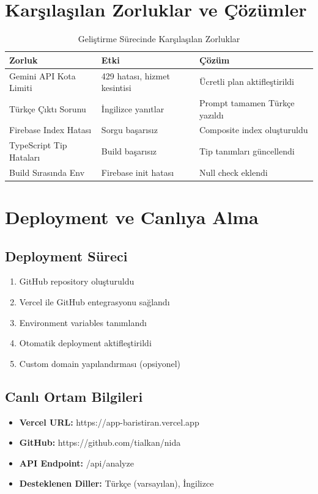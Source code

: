 \section{Karşılaşılan Zorluklar ve Çözümler}

\begin{table}[H]
\centering
\caption{Geliştirme Sürecinde Karşılaşılan Zorluklar}
\label{tab:zorluklar}
\begin{tabular}{p{4cm}p{4cm}p{5cm}}
\toprule
\textbf{Zorluk} & \textbf{Etki} & \textbf{Çözüm} \\
\midrule
Gemini API Kota Limiti & 429 hatası, hizmet kesintisi & Ücretli plan aktifleştirildi \\
Türkçe Çıktı Sorunu & İngilizce yanıtlar & Prompt tamamen Türkçe yazıldı \\
Firebase Index Hatası & Sorgu başarısız & Composite index oluşturuldu \\
TypeScript Tip Hataları & Build başarısız & Tip tanımları güncellendi \\
Build Sırasında Env & Firebase init hatası & Null check eklendi \\
\bottomrule
\end{tabular}
\end{table}

\section{Deployment ve Canlıya Alma}

\subsection{Deployment Süreci}

\begin{enumerate}
  \item GitHub repository oluşturuldu
  \item Vercel ile GitHub entegrasyonu sağlandı
  \item Environment variables tanımlandı
  \item Otomatik deployment aktifleştirildi
  \item Custom domain yapılandırması (opsiyonel)
\end{enumerate}

\subsection{Canlı Ortam Bilgileri}

\begin{itemize}
  \item \textbf{Vercel URL:} https://app-baristiran.vercel.app
  \item \textbf{GitHub:} https://github.com/tialkan/nida
  \item \textbf{API Endpoint:} /api/analyze
  \item \textbf{Desteklenen Diller:} Türkçe (varsayılan), İngilizce
\end{itemize}

\newpage

